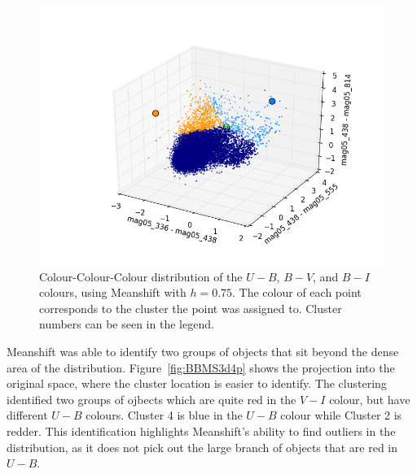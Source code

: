 \begin{figure}[H]
\centering
\includegraphics[width=\linewidth]{figs/meanshift_3d_color_4cl_mag05_336-mag05_438vsmag05_438-mag05_555vsmag05_438-mag05_814}
\caption{Colour-Colour-Colour distribution of the $U - B$, $B - V$, and $B - I$ colours, using Meanshift with $h=0.75$. The colour of each point corresponds to the cluster the point was assigned to. Cluster numbers can be seen in the legend.}
\label{fig:BB3dMS4}
\end{figure}

Meanshift was able to identify two groups of objects that sit beyond the dense area of the distribution.
Figure~\ref{fig:BBMS3d4p} shows the projection into the original space, where the cluster location is easier to identify.
The clustering identified two groups of ojbects which are quite red in the $V - I$ colour, but have different $U - B$ colours. 
Cluster 4 is blue in the $U - B$ colour while Cluster 2 is redder.
This identification highlights Meanshift's ability to find outliers in the distribution, as it does not pick out the large branch of objects that are red in $U - B$.

